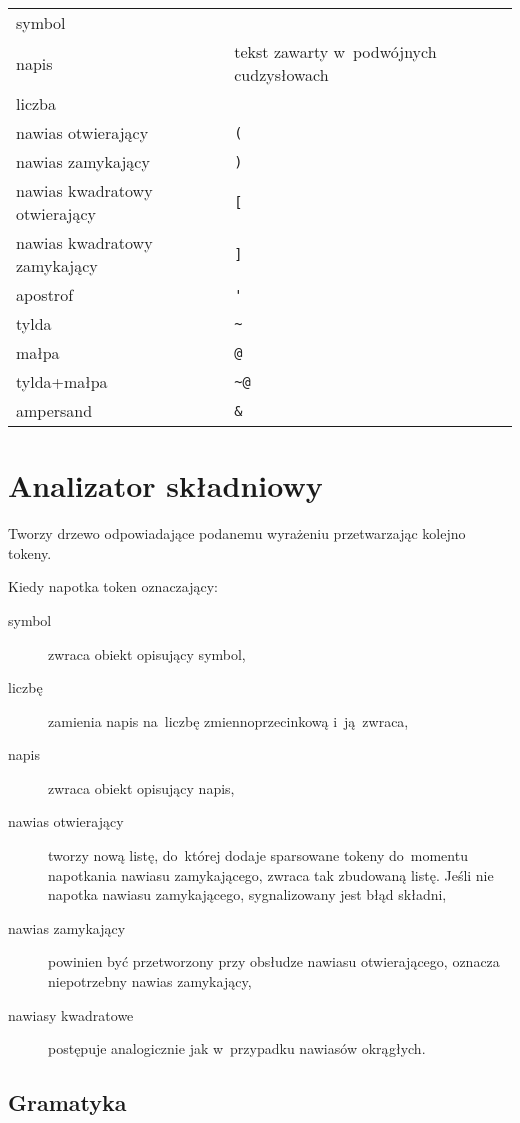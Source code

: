 \documentclass[a4paper,11pt]{article}
\begin{document}
\begin{table}[H]
  \centering
  \begin{tabular}{|p{6cm} p{6cm}|} \hline
    symbol & \\
    napis & tekst zawarty w~podwójnych cudzysłowach \\ 
    liczba & \\ \hline
    nawias otwierający & \verb+(+ \\
    nawias zamykający & \verb+)+ \\ \hline
    nawias kwadratowy otwierający & \verb+[+ \\
    nawias kwadratowy zamykający & \verb+]+ \\ \hline
    apostrof & \verb+'+ \\
    tylda & \verb+~+ \\
    małpa & \verb+@+ \\
    tylda+małpa & \verb+~@+ \\
    ampersand & \verb+&+ \\ \hline
  \end{tabular}
\end{table}

\section{Analizator składniowy}

Tworzy drzewo odpowiadające podanemu wyrażeniu przetwarzając kolejno tokeny.

Kiedy napotka token oznaczający:
\begin{description}
\item[symbol] zwraca obiekt opisujący symbol,
\item[liczbę] zamienia napis na~liczbę zmiennoprzecinkową i~ją~zwraca,
\item[napis] zwraca obiekt opisujący napis,
\item[nawias otwierający] tworzy nową listę, do~której dodaje sparsowane tokeny
  do~momentu napotkania nawiasu zamykającego, zwraca tak zbudowaną listę. Jeśli
  nie napotka nawiasu zamykającego, sygnalizowany jest błąd składni,
\item[nawias zamykający] powinien być przetworzony przy obsłudze nawiasu
  otwierającego, oznacza niepotrzebny nawias zamykający,
\item[nawiasy kwadratowe] postępuje analogicznie jak w~przypadku nawiasów
  okrągłych.
\end{description}

\subsection{Gramatyka}
\end{document}
